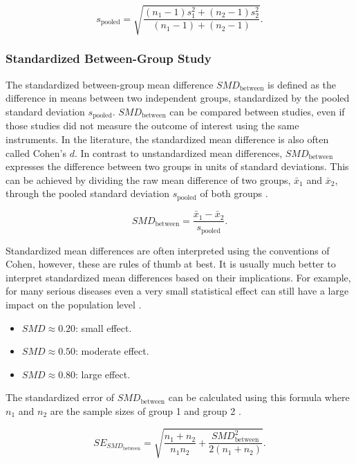 \documentclass[../../../main.tex]{subfiles}
\begin{document}
\begin{equation}
s_{\text{pooled}}=\sqrt{\frac{(n_1-1)s_1^2+(n_2-1)s_2^2}{(n_1-1)+(n_2-1)}}.
\end{equation}

\subsubsection{Standardized Between-Group Study}

The standardized between-group mean difference $SMD_\text{between}$ is defined as the difference in means between two independent groups, standardized by the pooled standard deviation $s_\text{pooled}$. $SMD_\text{between}$ can be compared between studies, even if those studies did not measure the outcome of interest using the same instruments. In the literature, the standardized mean difference is also often called Cohen's $d$. In contrast to unstandardized mean differences, $SMD_\text{between}$ expresses the difference between two groups in units of standard deviations. This can be achieved by dividing the raw mean difference of two groups, $\bar{x}_1$ and $\bar{x}_2$, through the pooled standard deviation $s_\text{pooled}$ of both groups \autocite{Harrer2021}.

\begin{equation}
SMD_\text{between}=\frac{\bar{x}_1-\bar{x}_2}{s_\text{pooled}}.
\end{equation}

Standardized mean differences are often interpreted using the conventions of Cohen, however, these are rules of thumb at best. It is usually much better to interpret standardized mean differences based on their implications. For example, for many serious diseases even a very small statistical effect can still have a large impact on the population level \autocite{Harrer2021}.

\begin{itemize}
\item $SMD \approx 0.20$: small effect.
\item $SMD \approx 0.50$: moderate effect.
\item $SMD \approx 0.80$: large effect.
\end{itemize}

The standardized error of $SMD_\text{between}$ can be calculated using this formula where $n_1$ and $n_2$ are the sample sizes of group 1 and group 2 \autocite{Harrer2021}.

\begin{equation}
SE_{SMD_\text{between}} = \sqrt{\frac{n_1+n_2}{n_1n_2}+\frac{SMD_\text{between}^2}{2(n_1+n_2)}}.
\end{equation}
\end{document}
